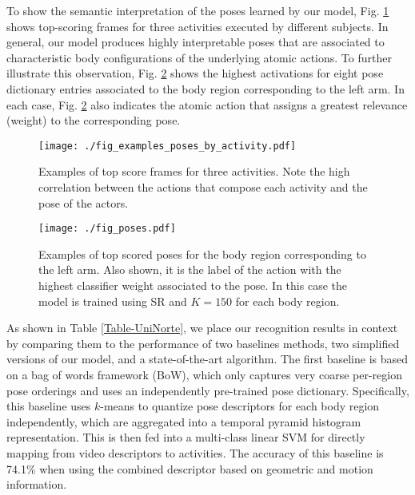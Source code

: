 To show the semantic interpretation of the poses learned by our model, Fig. 
\ref{fig:example_poses_by_activity} shows top-scoring frames for three activities executed by 
different 
subjects. In general, our model produces highly interpretable poses that are 
associated to characteristic body configurations of the underlying atomic actions. To further 
illustrate this observation, Fig. \ref{fig:poses} shows the highest activations for eight pose 
dictionary entries associated to the body region corresponding to the left arm. In each case, 
Fig. \ref{fig:poses} also indicates the atomic action that assigns a greatest relevance (weight) to 
the corresponding pose. 

\begin{figure}[tb]
\begin{center}
\texttt{[image: ./fig\_examples\_poses\_by\_activity.pdf]}
\end{center}
   \caption{Examples of top score frames for three activities. Note the high correlation between the actions that compose each activity and the pose of the actors.}
\label{fig:example_poses_by_activity}
\end{figure}


\begin{figure}[tb]
\begin{center}
\texttt{[image: ./fig\_poses.pdf]}
\end{center}
   \caption{Examples of top scored poses for the body 
region corresponding to the left arm. Also shown, it is the label of the action with 
the highest classifier weight associated to the pose. In this case the model is trained using SR 
and $K=150$ for 
each body region.}
\label{fig:poses}
\end{figure}

As shown in Table \ref{Table-UniNorte}, we place our recognition results in context by comparing 
them to the performance of
two baselines methods, two simplified versions of our model, and a state-of-the-art algorithm.
The first baseline is based on a bag of words framework
(BoW), which only captures very coarse per-region
pose orderings and uses an independently pre-trained pose dictionary. Specifically, 
this baseline uses $k$-means to quantize pose descriptors
for each body region independently, which are aggregated into
a temporal pyramid histogram representation.
This is then fed into a multi-class linear SVM
for directly mapping from video descriptors to activities. 
The accuracy of this
baseline is 74.1\% when using the combined
descriptor based on geometric and motion information.

